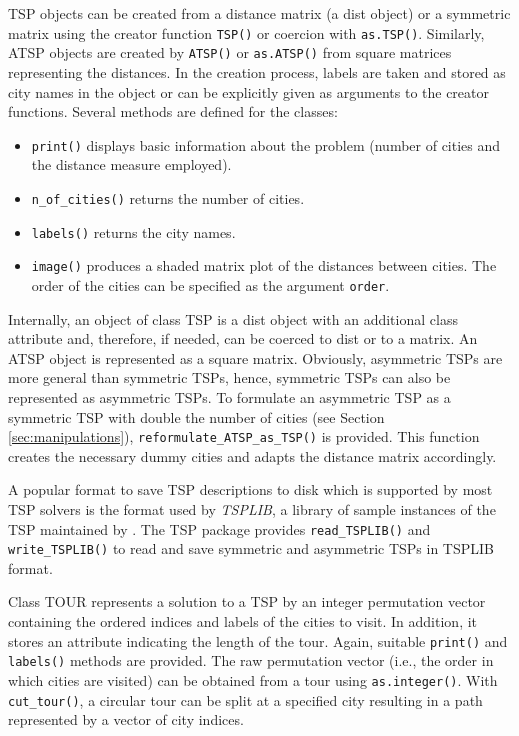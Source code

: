 \documentclass[10pt,a4paper,fleqn]{article}
\newcommand{\strong}[1]{{\normalfont\fontseries{b}\selectfont #1}}
\newcommand{\class}[1]{\mbox{\textsf{#1}}}
\newcommand{\func}[1]{\mbox{\texttt{#1()}}}
\newcommand{\code}[1]{\mbox{\texttt{#1}}}
\newcommand{\pkg}[1]{\strong{#1}}
\begin{document}
\class{TSP} objects can be created from a distance matrix (a
\class{dist} object) or a symmetric matrix using the creator function
\func{TSP} or coercion with \func{as.TSP}.  Similarly, \class{ATSP}
objects are created by \func{ATSP} or \func{as.ATSP} from square
matrices representing the distances.  In the creation process, labels
are taken and stored as city names in the object or can be explicitly
given as arguments to the creator functions.  Several methods are
defined for the classes:
\begin{itemize}
 \item \func{print} displays basic information about the problem (number
  of cities and the distance measure employed).
 \item \func{n\_of\_cities} returns the number of cities.
 \item \func{labels} returns the city names.
 \item \func{image} produces a shaded matrix plot of the distances
  between cities. The order of the cities can be specified as the
  argument \code{order}.
\end{itemize}

Internally, an object of class \class{TSP} is a \class{dist} object with
an additional class attribute and, therefore, if needed, can be coerced
to \class{dist} or to a matrix.  An \class{ATSP} object is represented
as a square matrix.  Obviously, asymmetric TSPs are more general than
symmetric TSPs, hence, symmetric TSPs can also be represented as
asymmetric TSPs.  To formulate an asymmetric TSP as a symmetric TSP with
double the number of cities (see Section \ref{sec:manipulations}),
\func{reformulate\_ATSP\_as\_TSP} is provided.  This function creates
the necessary dummy cities and adapts the distance matrix accordingly.

A popular format to save TSP descriptions to disk which is supported by
most TSP solvers is the format used by \emph{TSPLIB}, a library of
sample instances of the TSP maintained by \cite{Reinelt2004}. The
\pkg{TSP} package provides \func{read\_TSPLIB} and \func{write\_TSPLIB}
to read and save symmetric and asymmetric TSPs in TSPLIB format.

Class \class{TOUR} represents a solution to a TSP by an integer
permutation vector containing the ordered indices and labels of the
cities to visit.  In addition, it stores an attribute indicating the
length of the tour.  Again, suitable \func{print} and \func{labels}
methods are provided.  The raw permutation vector (i.e., the order in
which cities are visited) can be obtained from a tour using
\func{as.integer}.  With \func{cut\_tour}, a circular tour can be split
at a specified city resulting in a path represented by a vector of city
indices.
\end{document}
